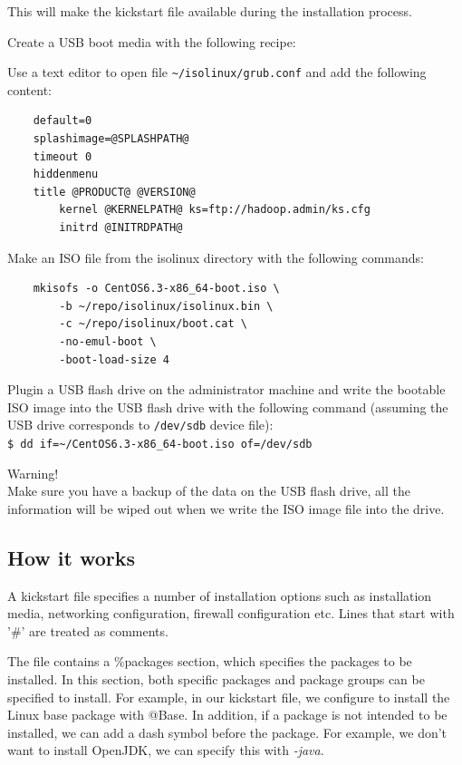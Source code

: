 This will make the kickstart file available during the installation process.

Create a USB boot media with the following recipe:

Use a text editor to open file \verb|~/isolinux/grub.conf| and add the following content:
\lstset{style=bashstyle}
\begin{lstlisting}
    default=0
    splashimage=@SPLASHPATH@
    timeout 0
    hiddenmenu
    title @PRODUCT@ @VERSION@
    	kernel @KERNELPATH@ ks=ftp://hadoop.admin/ks.cfg
    	initrd @INITRDPATH@
\end{lstlisting}

Make an ISO file from the isolinux directory with the following commands:
\lstset{style=bashstyle}
\begin{lstlisting}
    mkisofs -o CentOS6.3-x86_64-boot.iso \
        -b ~/repo/isolinux/isolinux.bin \
        -c ~/repo/isolinux/boot.cat \
        -no-emul-boot \
        -boot-load-size 4
\end{lstlisting}

Plugin a USB flash drive on the administrator machine and write the bootable ISO image into the USB flash drive with the following command (assuming the USB drive corresponds to \verb|/dev/sdb| device file): \\
\verb|$ dd if=~/CentOS6.3-x86_64-boot.iso of=/dev/sdb|

\begin{warning}
Warning! \\
Make sure you have a backup of the data on the USB flash drive, all the information will be wiped out when we write the ISO image file into the drive.
\end{warning}

\subsection*{How it works}
A kickstart file\index{kickstart file} specifies a number of installation options such as installation media, networking configuration, firewall configuration etc. Lines that start with '\#' are treated as comments.

The file contains a \%packages section, which specifies the packages to be installed. In this section, both specific packages and package groups can be specified to install. For example, in our kickstart file, we configure to install the Linux base package with @Base. In addition, if a package is not intended to be installed, we can add a dash symbol before the package. For example, we don't want to install OpenJDK, we can specify this with \emph{-java}.

